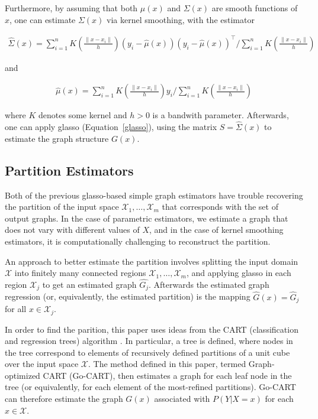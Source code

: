 \documentclass[12pt]{article}
\begin{document}
Furthermore, by assuming that both $\mu(x)$ and $\Sigma(x)$ are smooth
functions of $x$, one can estimate $\Sigma(x)$ via kernel smoothing,
with the estimator

\begin{align}
    \hat{\Sigma}(x) = \sum_{i=1}^n K \left( \frac{\|x-x_i\|}{h} \right) (y_i - \hat{\mu}(x)) (y_i - \hat{\mu}(x))^{\top} / \sum_{i=1}^n K \left( \frac{\| x - x_i \|}{h} \right)
\end{align}

and

\begin{align}
    \hat{\mu}(x) = \sum_{i=1}^n K\left( \frac{\|x-x_i\|}{h} \right) y_i / \sum_{i=1}^n K\left( \frac{\|x-x_i\|}{h} \right)
\end{align}

where $K$ denotes some kernel and $h>0$ is a bandwith
parameter. Afterwards, one can apply glasso (Equation~\ref{glasso}),
using the matrix $S = \hat{\Sigma}(x)$ to estimate the graph structure
$G(x)$.

\subsection{Partition Estimators}

Both of the previous glasso-based simple graph estimators have trouble
recovering the partition of the input space
$\mathcal{X}_1,\ldots,\mathcal{X}_m$ that corresponds with the set of
output graphs. In the case of parametric estimators, we estimate a
graph that does not vary with different values of $X$, and in the case
of kernel smoothing estimators, it is computationally challenging to
reconstruct the partition.

An approach to better estimate the partition involves splitting the
input domain $\mathcal{X}$ into finitely many connected regions
$\mathcal{X}_1,\ldots,\mathcal{X}_m$, and applying glasso in each
region $\mathcal{X}_j$ to get an estimated graph
$\hat{G_j}$. Afterwards the estimated graph regression (or,
equivalently, the estimated partition) is the mapping $\hat{G}(x) =
\hat{G}_j$ for all $x \in \mathcal{X}_j$.

In order to find the parition, this paper uses ideas from the CART
(classification and regression trees) algorithm
\cite{breiman1993classification}. In particular, a tree is defined,
where nodes in the tree correspond to elements of recursively defined
partitions of a unit cube over the input space $\mathcal{X}$. The
method defined in this paper, termed Graph-optimized CART (Go-CART),
then estimates a graph for each leaf node in the tree (or
equivalently, for each element of the most-refined
partitions). Go-CART can therefore estimate the graph $G(x)$
associated with $P(Y | X=x)$ for each $x \in \mathcal{X}$.
\end{document}
